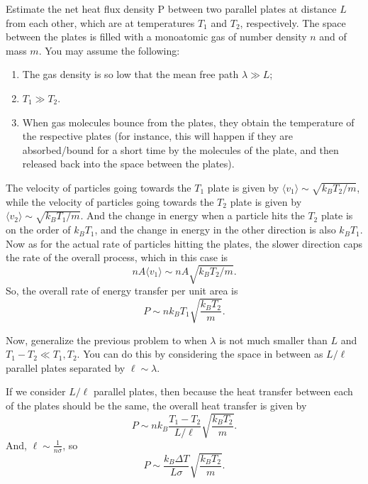 \documentclass[11pt]{scrartcl}
\begin{document}
\begin{prob}
    Estimate the net heat flux density P between two parallel plates at distance $L$ from each other, which are at temperatures $T_1$ and $T_2$, respectively. The space between the plates is filled with a monoatomic gas of number density $n$ and of mass $m$. You may assume the following:
    \begin{enumerate}
        \item The gas density is so low that the mean free path $\lambda \gg L$;
        \item $T_1 \gg T_2$.
        \item When gas molecules bounce from the plates, they obtain the temperature of the respective plates (for instance, this will happen if they are absorbed/bound for a short time by the molecules of the plate, and then released back into the space between the plates).
    \end{enumerate}
\end{prob}
\begin{sol}
    The velocity of particles going towards the $T_1$ plate is given by $\langle v_1\rangle \sim \sqrt{k_BT_2/m}$, while the velocity of particles going towards the $T_2$ plate is given by $\langle v_2 \rangle \sim \sqrt{k_BT_1/m}$. And the change in energy when a particle hits the $T_2$ plate is on the order of $k_BT_1$, and the change in energy in the other direction is also $k_BT_1$. Now as for the actual rate of particles hitting the plates, the slower direction caps the rate of the overall process, which  in this case is $$nA\langle v_1 \rangle \sim n A \sqrt{k_BT_2/m}.$$
    So, the overall rate of energy transfer per unit area is
    $$P \sim nk_BT_1\sqrt{\frac{k_BT_2}{m}}.$$
\end{sol}

\begin{prob}
    Now, generalize the previous problem to when $\lambda$ is not much smaller than $L$ and $T_1 - T_2 \ll T_1,T_2$. You can do this by considering the space in between as $L/\ell$ parallel plates separated by $\ell \sim \lambda$.
\end{prob}
\begin{sol}
    If we consider $L/\ell$ parallel plates, then because the heat transfer between each of the plates should be the same, the overall heat transfer is given by
    $$P \sim nk_B \frac{T_1 - T_2}{L/\ell}\sqrt{\frac{k_BT_2}{m}}.$$
    And, $\ell \sim \frac 1{n\sigma}$, so 
    $$P \sim \frac{k_B \Delta T}{L\sigma}\sqrt{\frac{k_BT_2}{m}}.$$
\end{sol}
\end{document}
